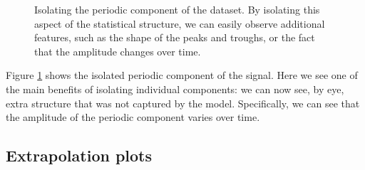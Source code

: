 \documentclass{article} %
\begin{document}
\begin{figure}[h!]
\centering
{}
\caption{Isolating the periodic component of the dataset.  By isolating this aspect of the statistical structure, we can easily observe additional features, such as the shape of the peaks and troughs, or the fact that the amplitude changes over time.}
\label{fig:periodic}
\end{figure}

Figure \ref{fig:periodic} shows the isolated periodic component of the signal.  Here we see one of the main benefits of isolating individual components: we can now see, by eye, extra structure that was not captured by the model.  Specifically, we can see that the amplitude of the periodic component varies over time.


\subsection{Extrapolation plots}
\end{document}
